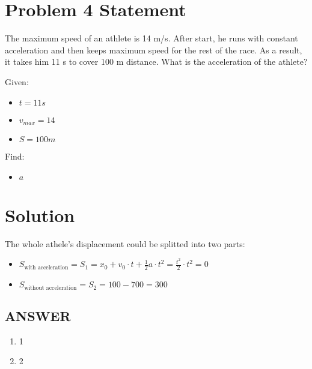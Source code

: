 \section*{Problem 4 Statement}

The maximum speed of an athlete is 14 m/s. After start, he runs with constant acceleration and
then keeps maximum speed for the rest of the race. As a result, it takes him 11 s to cover 100 m
distance. What is the acceleration of the athlete?

\bigbreak Given:

\begin{itemize}
    \item $t = 11s$
    \item $v_{max} = 14$
    \item $S = 100m$
\end{itemize}

\bigbreak Find:

\begin{itemize}
    \item $a$
\end{itemize}

\section*{Solution}

The whole athele's displacement could be splitted into two parts:

\begin{itemize}
    \item $S_{\text{with acceleration}} = S_1 = x_0 + v_0 \cdot t + \frac{1}{2} a \cdot t^2 = \frac{t^2}{2} \cdot t^2 = 0$
    \item $ S_{\text{without acceleration}} = S_2 = 100 - 700 = 300$
\end{itemize}

\vfill \subsection*{ANSWER}
\begin{enumerate}
    \item 1
    \item 2
\end{enumerate}
